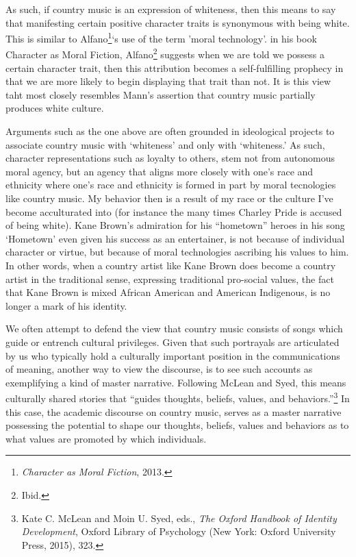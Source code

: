 \documentclass[phdthesis,12pt,final]{wuthesis}
\theoremstyle{definition}
\theoremstyle{definition}
\theoremstyle{definition}
\theoremstyle{definition}
\theoremstyle{remark}
\begin{document}
As such, if country music is an expression of whiteness, then this means to say that manifesting certain positive character traits is synonymous with being white. This is similar to Alfano\footnote{\emph{Character as Moral Fiction}, 2013.}`s use of the term 'moral technology'. in his book Character as Moral Fiction, Alfano\footnote{Ibid.} suggests when we are told we possess a certain character trait, then this attribution becomes a self-fulfilling prophecy in that we are more likely to begin displaying that trait than not. It is this view taht most closely resembles Mann's assertion that country music partially produces white culture.

Arguments such as the one above are often grounded in ideological projects to associate country music with `whiteness' and only with `whiteness.' As such, character representations such as loyalty to others, stem not from autonomous moral agency, but an agency that aligns more closely with one's race and ethnicity where one's race and ethnicity is formed in part by moral tecnologies like country music. My behavior then is a result of my race or the culture I've become acculturated into (for instance the many times Charley Pride is accused of being white). Kane Brown's admiration for his ``hometown'' heroes in his song `Hometown' even given his success as an entertainer, is not because of individual character or virtue, but because of moral technologies ascribing his values to him. In other words, when a country artist like Kane Brown does become a country artist in the traditional sense, expressing traditional pro-social values, the fact that Kane Brown is mixed African American and American Indigenous, is no longer a mark of his identity.

We often attempt to defend the view that country music consists of songs which guide or entrench cultural privileges. Given that such portrayals are articulated by us who typically hold a culturally important position in the communications of meaning, another way to view the discourse, is to see such accounts as exemplifying a kind of master narrative. Following McLean and Syed, this means culturally shared stories that ``guides thoughts, beliefs, values, and behaviors.''\footnote{Kate C. McLean and Moin U. Syed, eds., \emph{The {Oxford} Handbook of Identity Development}, Oxford Library of Psychology (New York: Oxford University Press, 2015), 323.} In this case, the academic discourse on country music, serves as a master narrative possessing the potential to shape our thoughts, beliefs, values and behaviors as to what values are promoted by which individuals.
\end{document}

